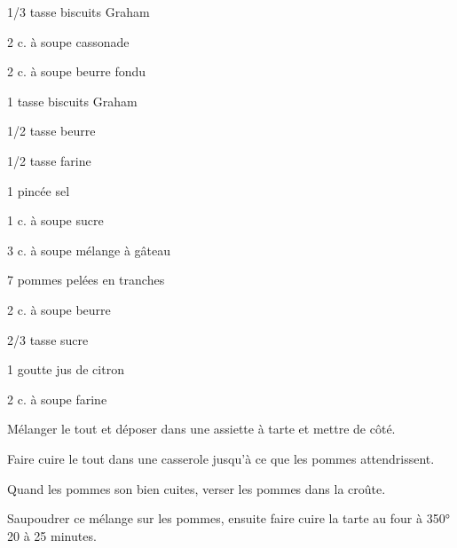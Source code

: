 


\totaltime{}


\begin{ingredients}
    \item[] 
    \item 1/3 tasse biscuits Graham
    \item 2 c. à soupe cassonade
    \item 2 c. à soupe beurre fondu
    \\
    \item[] 
    \item 1 tasse biscuits Graham
    \item 1/2 tasse beurre
    \item 1/2 tasse farine
    \item 1 pincée sel
    \item 1 c. à soupe sucre
    \\
    \item[] 
    \item 3 c. à soupe mélange à gâteau
    \item 7 pommes pelées en tranches
    \item 2 c. à soupe beurre
    \item 2/3 tasse sucre
    \item 1 goutte jus de citron
    \item 2 c. à soupe farine
\end{ingredients}

\begin{steps}
    \item[] 
    \item Mélanger le tout et déposer dans une assiette à tarte et mettre de côté.
    \\
    \item[] 
    \item Faire cuire le tout dans une casserole jusqu'à ce que les pommes attendrissent.
    \item Quand les pommes son bien cuites, verser les pommes dans la croûte.
    \\
    \item[] 
    \item Saupoudrer ce mélange sur les pommes, ensuite faire cuire la tarte au four à 350° 20 à 25 minutes.
\end{steps}
